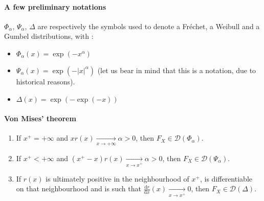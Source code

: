 \paragraph{A few preliminary notations} $\Phi_\alpha$, $\Psi_\alpha$, $\Delta$ are respectively the symbols used to denote a Fréchet, a Weibull and a Gumbel distributions, with :
\begin{itemize}
	\item $\Phi_\alpha(x) = \exp(- x^\alpha)$
	\item $\Psi_\alpha(x) = \exp(-  \lvert x \rvert^\alpha)$ (let us bear in mind that this is a notation, due to historical reasons).
	\item $\Delta(x) = \exp(- \exp(- x))$
\end{itemize}
\paragraph{Von Mises' theorem}
\begin{enumerate}
	\item If $x^+ = + \infty$ and $x r(x) \xrightarrow[x \rightarrow + \infty]{} \alpha > 0$, then $F_X \in \mathcal{D}(\Phi_\alpha)$.
	\item If $x^+ < + \infty$ and $(x^+ - x) r(x) \xrightarrow[x \rightarrow x^+]{} \alpha > 0$, then $F_X \in \mathcal{D}(\Psi_\alpha)$.
	\item If $r(x)$ is ultimately positive in the neighbourhood of $x^+$, is differentiable on that neighbourhood and is such that $\frac{\mathrm{d}r}{\mathrm{d}x}(x) \xrightarrow[x \rightarrow x^+]{} 0$, then $F_X \in \mathcal{D}(\Delta)$.
\end{enumerate}







